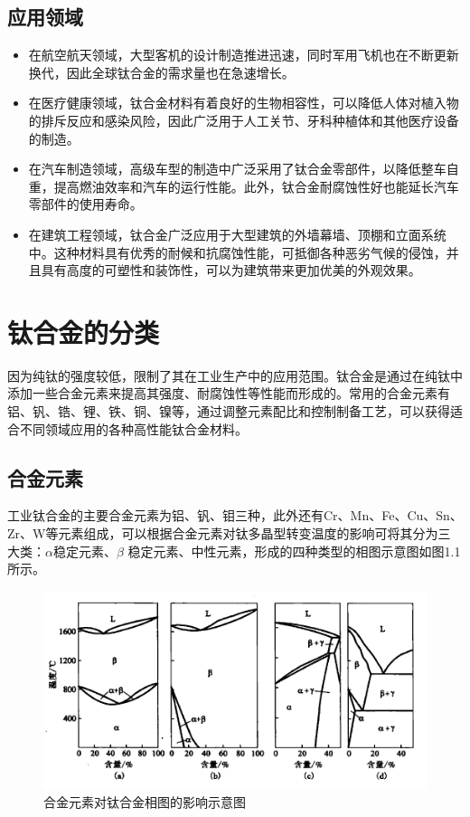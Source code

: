 \subsection{应用领域}

\begin{itemize}
\item  在航空航天领域，大型客机的设计制造推进迅速，同时军用飞机也在不断更新换代，因此全球钛合金的需求量也在急速增长。
\item  在医疗健康领域，钛合金材料有着良好的生物相容性，可以降低人体对植入物的排斥反应和感染风险，因此广泛用于人工关节、牙科种植体和其他医疗设备的制造。
\item  在汽车制造领域，高级车型的制造中广泛采用了钛合金零部件，以降低整车自重，提高燃油效率和汽车的运行性能。此外，钛合金耐腐蚀性好也能延长汽车零部件的使用寿命。
\item  在建筑工程领域，钛合金广泛应用于大型建筑的外墙幕墙、顶棚和立面系统中。这种材料具有优秀的耐候和抗腐蚀性能，可抵御各种恶劣气候的侵蚀，并且具有高度的可塑性和装饰性，可以为建筑带来更加优美的外观效果。

\end{itemize}
\section{钛合金的分类}
\label{sec:1.1}
因为纯钛的强度较低，限制了其在工业生产中的应用范围。钛合金是通过在纯钛中添加一些合金元素来提高其强度、耐腐蚀性等性能而形成的。常用的合金元素有铝、钒、锆、锂、铁、铜、镍等，通过调整元素配比和控制制备工艺，可以获得适合不同领域应用的各种高性能钛合金材料。

\subsection*{合金元素}
工业钛合金的主要合金元素为铝、钒、钼三种，此外还有Cr、Mn、Fe、Cu、Sn、Zr、W等元素组成，可以根据合金元素对钛多晶型转变温度的影响可将其分为三大类：$\alpha$稳定元素、$\beta$ 稳定元素、中性元素，形成的四种类型的相图示意图如图1.1所示。
\begin{figure}[h!]
	\centering
	\includegraphics[width=0.9\linewidth]{pic/01}
	\caption{合金元素对钛合金相图的影响示意图}
	\label{fig:01}
\end{figure}

